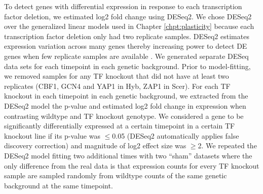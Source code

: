 To detect genes with differential expression in response to each transcription factor deletion, we estimated log2 fold change using DESeq2. We chose DESeq2 over the generalized linear models used in Chapter \ref{chpt:plasticity} because each transcription factor deletion only had two replicate samples. DESeq2 estimates expression variation across many genes thereby increasing power to detect DE genes when few replicate samples are available \cite{Love2014}. We generated separate DESeq data sets for each timepoint in each genetic background. Prior to model-fitting, we removed samples for any TF knockout that did not have at least two replicates (CBF1, GCN4 and YAP1 in Hyb, ZAP1 in Scer). For each TF knockout in each timepoint in each genetic background, we extracted from the DESeq2 model the p-value and estimated log2 fold change in expression when contrasting wildtype and TF knockout genotype.  We considered a gene to be significantly differentially expressed at a certain timepoint in a certain TF knockout line if its p-value was $\leq$0.05 (DESeq2 automatically applies false discovery correction) and magnitude of log2 effect size was $\geq$2. We repeated the DESeq2 model fitting two additional times with two ``sham'' datasets where the only difference from the real data is that expression counts for every TF knockout sample are sampled randomly from wildtype counts of the same genetic background at the same timepoint.
